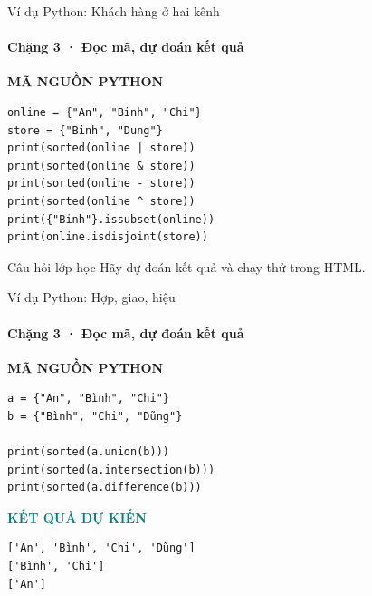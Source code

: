 \documentclass[aspectratio=169,10pt]{beamer}
\begin{document}
\begin{frame}[fragile,t]{Ví dụ Python: Khách hàng ở hai kênh}
\framesubtitle{Chặng 3 · Đọc mã, dự đoán kết quả}
\vspace{-1mm}
{\small\color{muted}\textbf{MÃ NGUỒN PYTHON}}\par\vspace{1mm}
\begin{Verbatim}[fontsize=\scriptsize,frame=single,framesep=4mm,rulecolor=\color{teal!35},breaklines=true]
online = {"An", "Binh", "Chi"}
store = {"Binh", "Dung"}
print(sorted(online | store))
print(sorted(online & store))
print(sorted(online - store))
print(sorted(online ^ store))
print({"Binh"}.issubset(online))
print(online.isdisjoint(store))
\end{Verbatim}
\begin{block}{Câu hỏi lớp học} Hãy dự đoán kết quả và chạy thử trong HTML. \end{block}

\end{frame}

\begin{frame}[fragile,t]{Ví dụ Python: Hợp, giao, hiệu}
\framesubtitle{Chặng 3 · Đọc mã, dự đoán kết quả}
\vspace{-1mm}
{\small\color{muted}\textbf{MÃ NGUỒN PYTHON}}\par\vspace{1mm}
\begin{Verbatim}[fontsize=\scriptsize,frame=single,framesep=4mm,rulecolor=\color{teal!35},breaklines=true]
a = {"An", "Bình", "Chi"}
b = {"Bình", "Chi", "Dũng"}

print(sorted(a.union(b)))
print(sorted(a.intersection(b)))
print(sorted(a.difference(b)))
\end{Verbatim}
\vspace{1mm}\textcolor{teal}{\scriptsize\textbf{KẾT QUẢ DỰ KIẾN}}
\begin{Verbatim}[fontsize=\scriptsize,breaklines=true]
['An', 'Bình', 'Chi', 'Dũng']
['Bình', 'Chi']
['An']
\end{Verbatim}

\end{frame}
\end{document}
